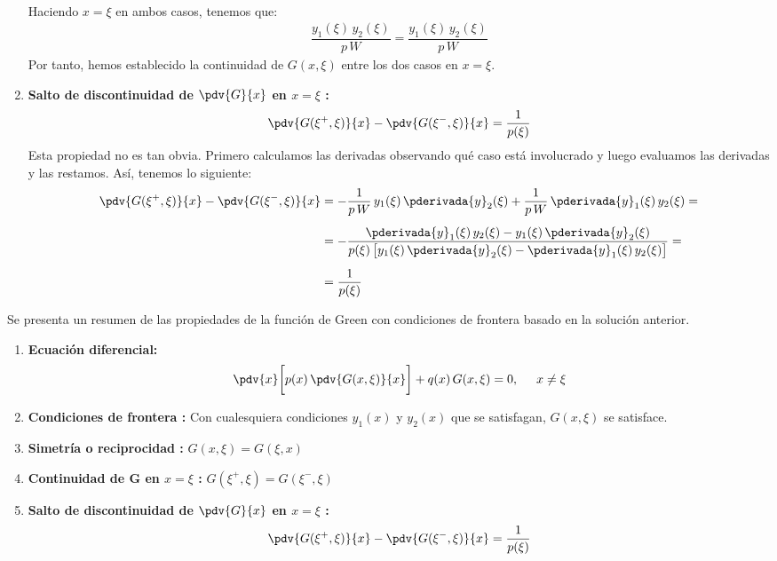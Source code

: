 \begin{enumerate}
\begin{align*}
\end{align*}
Haciendo $x = \xi$ en ambos casos, tenemos que:
\begin{align*}
\dfrac{y_{1} (\xi) \, y_{2} (\xi)}{p \, W} = \dfrac{y_{1} (\xi) \, y_{2} (\xi)}{p \, W}
\end{align*}
Por tanto, hemos establecido la continuidad de $G (x, \xi)$ entre los dos casos en $x = \xi$.
\item \textbf{Salto de discontinuidad de $\displaystyle \pdv{G}{x}$ en $x = \xi$ :}
\begin{align*}
\pdv{G (\xi^{+}, \xi)}{x} - \pdv{G (\xi^{-}, \xi)}{x} = \dfrac{1}{p (\xi)}
\end{align*}
Esta propiedad no es tan obvia. Primero calculamos las derivadas observando qué caso está involucrado y luego evaluamos las derivadas y las restamos. Así, tenemos lo siguiente:
\begin{align}
\begin{aligned}[b]
\pdv{G (\xi^{+}, \xi)}{x} - \pdv{G (\xi^{-}, \xi)}{x} &= - \dfrac{1}{p \, W} \, y_{1} (\xi) \, \pderivada{y}_{2} (\xi) + \dfrac{1}{p \, W} \, \pderivada{y}_{1} (\xi) \, y_{2} (\xi) = \\[0.5em]
&= - \dfrac{\pderivada{y}_{1} (\xi) \, y_{2} (\xi) - y_{1} (\xi) \, \pderivada{y}_{2} (\xi)}{p (\xi) \, \big[ y_{1} (\xi) \, \pderivada{y}_{2} (\xi) - \pderivada{y}_{1} (\xi) \, y_{2} (\xi) \big]} = \\[0.5em]
&= \dfrac{1}{p (\xi)}
\end{aligned}
\label{eq:ecuacion_07_37}
\end{align}
\end{enumerate}
Se presenta un resumen de las propiedades de la función de Green con condiciones de frontera basado en la solución anterior.
\begin{tcolorbox}[title={\centering Propiedades de la función de Green}]

\begin{enumerate}
\item \textbf{Ecuación diferencial:}
\begin{align*}
\pdv{x} \bigg[ p (x) \, \pdv{G (x, \xi)}{x} \bigg] + q (x) \, G (x, \xi) = 0, \hspace{0.5cm} x \neq \xi
\end{align*}
\item \textbf{Condiciones de frontera :} Con cualesquiera condiciones $y_{1} (x)$ y $y_{2} (x)$ que se satisfagan, $G (x, \xi)$ se satisface.
\item \textbf{Simetría o reciprocidad :} $G (x, \xi) = G (\xi, x)$
\item \textbf{Continuidad de $\mathbf{G}$ en $x = \xi$ :} $G (\xi^{+}, \xi) = G (\xi^{-}, \xi)$
\item \textbf{Salto de discontinuidad de $\displaystyle \pdv{G}{x}$ en $x = \xi$ :}
\begin{align*}
\pdv{G (\xi^{+}, \xi)}{x} - \pdv{G (\xi^{-}, \xi)}{x} = \dfrac{1}{p (\xi)}
\end{align*}
\end{enumerate}
\end{tcolorbox}
